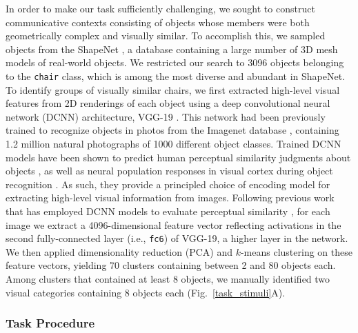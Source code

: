 \documentclass[10pt,letterpaper]{article}
\begin{document}
In order to make our task sufficiently challenging, we sought to construct communicative contexts consisting of objects whose members were both geometrically complex and visually similar.
To accomplish this, we sampled objects from the ShapeNet \cite{chang2015shapenet}, a database containing a large number of 3D mesh models of real-world objects. %
We restricted our search to 3096 objects belonging to the \texttt{chair} class, which is among the most diverse and abundant in ShapeNet.
To identify groups of visually similar chairs, we first extracted high-level visual features from 2D renderings of each object using a deep convolutional neural network (DCNN) architecture, VGG-19 \cite{simonyan2014very}.
This network had been previously trained to recognize objects in photos from the Imagenet database \cite{deng2009imagenet}, containing 1.2 million natural photographs of 1000 different object classes.
Trained DCNN models have been shown to predict human perceptual similarity judgments about objects \cite{kubilius2016deep,peterson2018evaluating}, as well as neural population responses in visual cortex during object recognition \cite{yamins2014performance,gucclu2015deep}.
As such, they provide a principled choice of encoding model for extracting high-level visual information from images.
Following previous work that has employed DCNN models to evaluate perceptual similarity \cite{FanCommon2018,peterson2018evaluating,kubilius2016deep}, for each image we extract a 4096-dimensional feature vector reflecting activations in the second fully-connected layer (i.e., \texttt{fc6}) of VGG-19, a higher layer in the network.
We then applied dimensionality reduction (PCA) and $k$-means clustering on these feature vectors, yielding 70 clusters containing between 2 and 80 objects each.
Among clusters that contained at least 8 objects, we manually identified two visual categories containing 8 objects each (Fig.~\ref{task_stimuli}A).

\subsubsection{Task Procedure}
\end{document}
